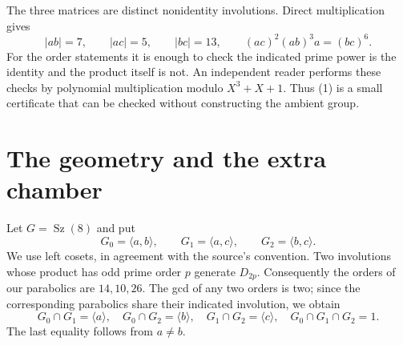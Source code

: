 \documentclass[11pt,a4paper]{article}
\newcommand{\gen}[1]{\langle#1\rangle}
\newcommand{\Sz}{\operatorname{Sz}}
\begin{document}
The three matrices are distinct nonidentity involutions. Direct multiplication
gives
\[
 |ab|=7,\qquad |ac|=5,\qquad |bc|=13,\qquad
 (ac)^2(ab)^3a=(bc)^6.                                      \tag{1}
\]
For the order statements it is enough to check the indicated prime power
is the identity and the product itself is not. An independent reader
performs these checks by polynomial multiplication modulo $X^3+X+1$.
Thus (1) is a small certificate that can be checked without constructing
the ambient group.

\section{The geometry and the extra chamber}
Let $G=\Sz(8)$ and put
\[
 G_0=\gen{a,b},\qquad G_1=\gen{a,c},\qquad G_2=\gen{b,c}.
\]
We use left cosets, in agreement with the source's convention.
Two involutions whose product has odd prime order $p$ generate $D_{2p}$.
Consequently the orders of our parabolics are $14,10,26$. The gcd of
any two orders is two; since the corresponding parabolics share their
indicated involution, we obtain
\[
 G_0\cap G_1=\gen a,\quad G_0\cap G_2=\gen b,\quad
 G_1\cap G_2=\gen c,\quad G_0\cap G_1\cap G_2=1.           \tag{2}
\]
The last equality follows from $a\ne b$.
\end{document}
